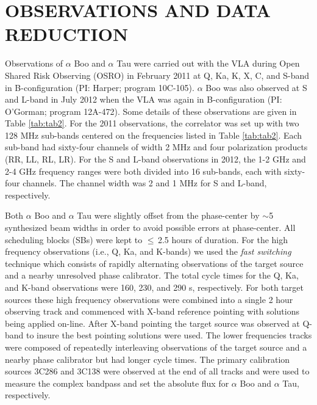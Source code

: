 \documentclass[iop]{emulateapj}
\begin{document}
\section{OBSERVATIONS AND DATA REDUCTION}

Observations of $\alpha$ Boo and $\alpha$ Tau were carried out with the VLA during Open Shared Risk Observing (OSRO) in February 2011 at Q, Ka, K, X, C, and S-band in B-configuration (PI: Harper; program 10C-105). $\alpha$ Boo was also observed at S and L-band in July 2012 when the VLA was again in B-configuration (PI: O'Gorman; program 12A-472). Some details of these observations are given in Table \ref{tab:tab2}. For the 2011 observations, the correlator was set up with two 128 MHz sub-bands centered on the frequencies listed in Table \ref{tab:tab2}. Each sub-band had sixty-four channels of width 2 MHz and four polarization products (RR, LL, RL, LR). For the S and L-band observations in 2012, the 1-2 GHz and 2-4 GHz frequency ranges were both divided into 16 sub-bands, each with sixty-four channels. The channel width was 2 and 1 MHz for S and L-band, respectively.

Both $\alpha$ Boo and $\alpha$ Tau were slightly offset from the phase-center by $\sim$5 synthesized beam widths in order to avoid possible errors at phase-center. All scheduling blocks (SBs) were kept to $\le$\,2.5 hours of duration. For the high frequency observations (i.e., Q, Ka, and K-bands) we used the \textit{fast switching} technique which consists of rapidly alternating observations of the target source and a nearby unresolved phase calibrator. The total cycle times for the Q, Ka, and K-band observations were 160, 230, and 290 s, respectively. For both target sources these high frequency observations were combined into a single 2 hour observing track and commenced with X-band reference pointing with solutions being applied on-line. After X-band pointing the target source was observed at Q-band to insure the best pointing solutions were used. The lower frequencies tracks were composed of repeatedly interleaving observations of the target source and a nearby phase calibrator but had longer cycle times. The primary calibration sources 3C286 and 3C138 were observed at the end of all tracks and were used to measure the complex bandpass and set the absolute flux for $\alpha$ Boo and $\alpha$ Tau, respectively.  
\end{document}
